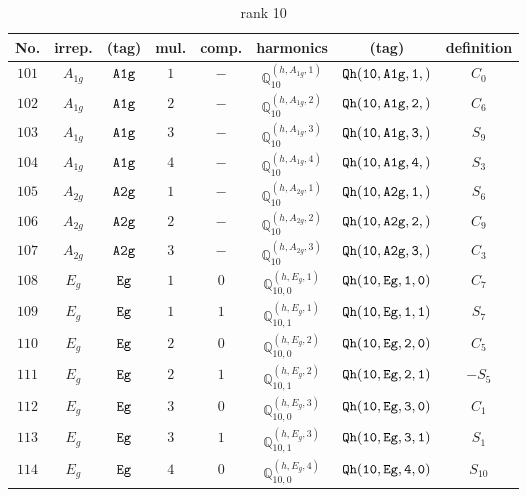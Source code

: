 \documentclass[fleqn,8pt]{jsarticle}
\begin{document}
\begin{table}[ht!]
\begin{center}
\caption{rank 10}
\renewcommand{\arraystretch}{1.3}
\begin{tabular}{cccccccc} \hline \hline
No. & irrep. & (tag) & mul. & comp. & harmonics & (tag) & definition \\ \hline
$ 101 $ & $ A_{1g} $ & $ {\tt A1g} $ & $ 1 $ & $ - $ & $ \mathbb{Q}_{10}^{(h,A_{1g},1)} $ & $ {\tt Qh(10,A1g,1,)} $ & $ C_{0} $ \\
$ 102 $ & $ A_{1g} $ & $ {\tt A1g} $ & $ 2 $ & $ - $ & $ \mathbb{Q}_{10}^{(h,A_{1g},2)} $ & $ {\tt Qh(10,A1g,2,)} $ & $ C_{6} $ \\
$ 103 $ & $ A_{1g} $ & $ {\tt A1g} $ & $ 3 $ & $ - $ & $ \mathbb{Q}_{10}^{(h,A_{1g},3)} $ & $ {\tt Qh(10,A1g,3,)} $ & $ S_{9} $ \\
$ 104 $ & $ A_{1g} $ & $ {\tt A1g} $ & $ 4 $ & $ - $ & $ \mathbb{Q}_{10}^{(h,A_{1g},4)} $ & $ {\tt Qh(10,A1g,4,)} $ & $ S_{3} $ \\
$ 105 $ & $ A_{2g} $ & $ {\tt A2g} $ & $ 1 $ & $ - $ & $ \mathbb{Q}_{10}^{(h,A_{2g},1)} $ & $ {\tt Qh(10,A2g,1,)} $ & $ S_{6} $ \\
$ 106 $ & $ A_{2g} $ & $ {\tt A2g} $ & $ 2 $ & $ - $ & $ \mathbb{Q}_{10}^{(h,A_{2g},2)} $ & $ {\tt Qh(10,A2g,2,)} $ & $ C_{9} $ \\
$ 107 $ & $ A_{2g} $ & $ {\tt A2g} $ & $ 3 $ & $ - $ & $ \mathbb{Q}_{10}^{(h,A_{2g},3)} $ & $ {\tt Qh(10,A2g,3,)} $ & $ C_{3} $ \\
$ 108 $ & $ E_{g} $ & $ {\tt Eg} $ & $ 1 $ & $ 0 $ & $ \mathbb{Q}_{10,0}^{(h,E_{g},1)} $ & $ {\tt Qh(10,Eg,1,0)} $ & $ C_{7} $ \\
$ 109 $ & $ E_{g} $ & $ {\tt Eg} $ & $ 1 $ & $ 1 $ & $ \mathbb{Q}_{10,1}^{(h,E_{g},1)} $ & $ {\tt Qh(10,Eg,1,1)} $ & $ S_{7} $ \\
$ 110 $ & $ E_{g} $ & $ {\tt Eg} $ & $ 2 $ & $ 0 $ & $ \mathbb{Q}_{10,0}^{(h,E_{g},2)} $ & $ {\tt Qh(10,Eg,2,0)} $ & $ C_{5} $ \\
$ 111 $ & $ E_{g} $ & $ {\tt Eg} $ & $ 2 $ & $ 1 $ & $ \mathbb{Q}_{10,1}^{(h,E_{g},2)} $ & $ {\tt Qh(10,Eg,2,1)} $ & $ - S_{5} $ \\
$ 112 $ & $ E_{g} $ & $ {\tt Eg} $ & $ 3 $ & $ 0 $ & $ \mathbb{Q}_{10,0}^{(h,E_{g},3)} $ & $ {\tt Qh(10,Eg,3,0)} $ & $ C_{1} $ \\
$ 113 $ & $ E_{g} $ & $ {\tt Eg} $ & $ 3 $ & $ 1 $ & $ \mathbb{Q}_{10,1}^{(h,E_{g},3)} $ & $ {\tt Qh(10,Eg,3,1)} $ & $ S_{1} $ \\
$ 114 $ & $ E_{g} $ & $ {\tt Eg} $ & $ 4 $ & $ 0 $ & $ \mathbb{Q}_{10,0}^{(h,E_{g},4)} $ & $ {\tt Qh(10,Eg,4,0)} $ & $ S_{10} $ \\

\end{tabular}
\end{center}
\end{table}
\end{document}
